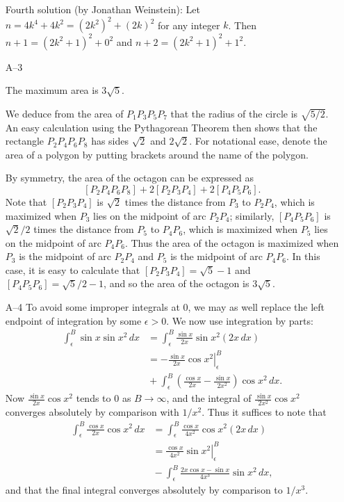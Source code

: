 \documentclass[amssymb,twocolumn,pra,10pt,aps]{revtex4-1}
\begin{document}
\begin{itemize}
Fourth solution (by Jonathan Weinstein):
Let $n=4k^4+4k^2=(2k^2)^2+(2k)^2$ for any integer $k$. Then $n+1=(2k^2+1)^2+0^2$ and $n+2=(2k^2+1)^2+1^2$.

\item[A--3]

The maximum area is $3 \sqrt{5}$.

We deduce from the area of $P_1P_3P_5P_7$ that the radius of the circle
is $\sqrt{5/2}$.  An easy calculation using the Pythagorean Theorem then
shows that the rectangle $P_2P_4P_6P_8$ has sides $\sqrt{2}$ and
$2\sqrt{2}$.
For notational ease, denote the area of a polygon by putting brackets
around the name of the polygon.

By symmetry, the area of the octagon can be expressed as
\[
[P_2P_4P_6P_8] + 2[P_2P_3P_4] + 2[P_4P_5P_6].
\]
Note that $[P_2P_3P_4]$ is $\sqrt{2}$ times
the distance from $P_3$ to $P_2P_4$, which is maximized when $P_3$
lies on the midpoint of arc $P_2P_4$; similarly, $[P_4P_5P_6]$ is
$\sqrt{2}/2$ times the distance from $P_5$ to $P_4P_6$, which is
maximized when $P_5$ lies on the midpoint of arc $P_4P_6$. Thus the
area of the octagon is maximized when $P_3$ is the
midpoint of arc $P_2P_4$ and $P_5$ is the midpoint of arc $P_4P_6$.
In this case, it is easy to calculate that $[P_2P_3P_4] = \sqrt{5}-1$
and $[P_4P_5P_6] = \sqrt{5}/2-1$, and so the area of the octagon is
$3\sqrt{5}$.

\item[A--4]
To avoid some improper integrals at 0, we may as well replace the left endpoint of integration by some $\epsilon > 0$. We now use integration by parts:
\begin{align*}
\int_\epsilon^B \sin x \sin x^2\,dx
&= \int_\epsilon^B \frac{\sin x}{2x} \sin x^2 (2x\,dx) \\
&= \left. -\frac{\sin x}{2x} \cos x^2 \right|_\epsilon^B \\
&\mbox{} + \int_\epsilon^B \left( \frac{\cos x}{2x} - \frac{\sin x}{2x^2} \right) \cos x^2\,dx.
\end{align*}
Now $\frac{\sin x}{2x} \cos x^2$ tends to 0 as $B \to \infty$,
and the integral of $\frac{\sin x}{2x^2} \cos x^2$ converges absolutely
by comparison with $1/x^2$. Thus it suffices to note that
\begin{align*}
\int_\epsilon^B \frac{\cos x}{2x} \cos x^2\,dx &=
\int_\epsilon^B \frac{\cos x}{4x^2} \cos x^2(2x\,dx) \\
&= \left. \frac{\cos x}{4x^2} \sin x^2 \right|_\epsilon^B \\
&\mbox{} - \int_\epsilon^B \frac{2x\cos x - \sin x}{4x^3} \sin x^2\,dx,
\end{align*}
and that the final integral converges absolutely by comparison to
$1/x^3$.


\end{itemize}
\end{document}

